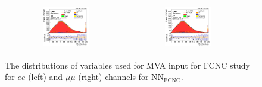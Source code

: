 \begin{figure}[ht]
  \begin{center}
    \begin{tabular}{ccc}
      \includegraphics[width=0.4\textwidth]{figures/tW/fig/FCNC_MVA_input/ee/H_BSM_xj1b_Ptll.png}&
      \includegraphics[width=0.4\textwidth]{figures/tW/fig/FCNC_MVA_input/mumu/H_BSM_xj1b_Ptll.png}\\
    \end{tabular}
    \caption{The distributions of variables used for MVA input for FCNC study for $ee$ (left) and $\mu\mu$ (right) channels for NN$_{\text{FCNC}}$.
    \label{fig:MVA_FCNC_1j1t_1}}
  \end{center}
\end{figure}

